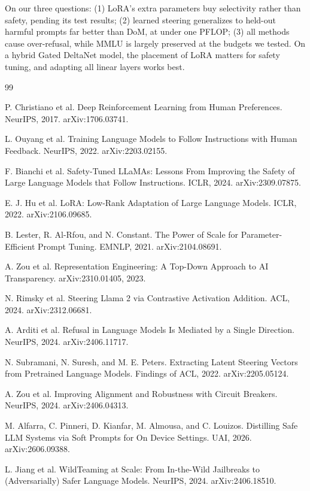 \documentclass{article}
\begin{document}
On our three questions: (1) LoRA's extra parameters buy selectivity rather than safety, pending its test results; (2) learned steering generalizes to held-out harmful prompts far better than DoM, at under one PFLOP; (3) all methods cause over-refusal, while MMLU is largely preserved at the budgets we tested. On a hybrid Gated DeltaNet model, the placement of LoRA matters for safety tuning, and adapting all linear layers works best.

\clearpage
\begin{thebibliography}{99}

 P. Christiano et al. Deep Reinforcement Learning from Human Preferences. NeurIPS, 2017. arXiv:1706.03741.

 L. Ouyang et al. Training Language Models to Follow Instructions with Human Feedback. NeurIPS, 2022. arXiv:2203.02155.

 F. Bianchi et al. Safety-Tuned LLaMAs: Lessons From Improving the Safety of Large Language Models that Follow Instructions. ICLR, 2024. arXiv:2309.07875.

 E. J. Hu et al. LoRA: Low-Rank Adaptation of Large Language Models. ICLR, 2022. arXiv:2106.09685.

 B. Lester, R. Al-Rfou, and N. Constant. The Power of Scale for Parameter-Efficient Prompt Tuning. EMNLP, 2021. arXiv:2104.08691.

 A. Zou et al. Representation Engineering: A Top-Down Approach to AI Transparency. arXiv:2310.01405, 2023.

 N. Rimsky et al. Steering Llama 2 via Contrastive Activation Addition. ACL, 2024. arXiv:2312.06681.

 A. Arditi et al. Refusal in Language Models Is Mediated by a Single Direction. NeurIPS, 2024. arXiv:2406.11717.

 N. Subramani, N. Suresh, and M. E. Peters. Extracting Latent Steering Vectors from Pretrained Language Models. Findings of ACL, 2022. arXiv:2205.05124.

 A. Zou et al. Improving Alignment and Robustness with Circuit Breakers. NeurIPS, 2024. arXiv:2406.04313.

 M. Alfarra, C. Pinneri, D. Kianfar, M. Almousa, and C. Louizos. Distilling Safe LLM Systems via Soft Prompts for On Device Settings. UAI, 2026. arXiv:2606.09388.

 L. Jiang et al. WildTeaming at Scale: From In-the-Wild Jailbreaks to (Adversarially) Safer Language Models. NeurIPS, 2024. arXiv:2406.18510.


\end{thebibliography}
\end{document}
